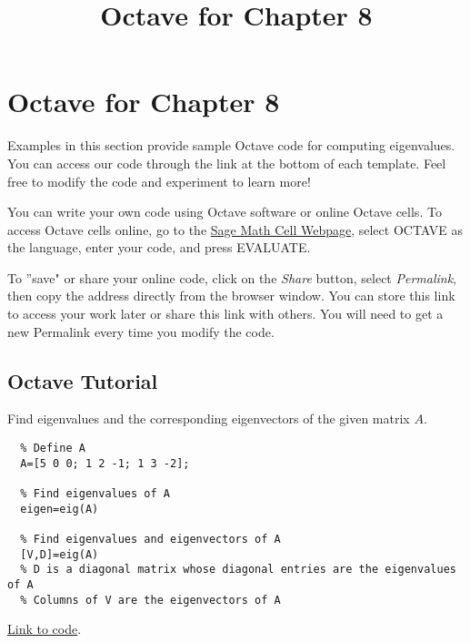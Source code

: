 \documentclass{ximera}
\title{Octave for Chapter 8} \license{CC BY-NC-SA 4.0}
\begin{document}
\begin{abstract}
\end{abstract}
\maketitle

\section*{Octave for Chapter 8}

Examples in this section provide sample Octave code for computing eigenvalues. You can access our code through the link at the bottom of each template.  Feel free to modify the code and experiment to learn more!  

You can write your own code using Octave software or online Octave cells.  To access Octave cells online, go to the \href{https://sagecell.sagemath.org/}{Sage Math Cell Webpage}, select OCTAVE as the language, enter your code, and press EVALUATE.  

To ''save" or share your online code, click on the \emph{Share} button, select \emph{Permalink}, then copy the address directly from the browser window.  You can store this link to access your work later or share this link with others.  You will need to get a new Permalink every time you modify the code.

\subsection*{Octave Tutorial}

\begin{template}\label{temp:eigen}
  Find eigenvalues and the corresponding eigenvectors of the given matrix $A$.
  
  \begin{verbatim}
  % Define A
  A=[5 0 0; 1 2 -1; 1 3 -2];
  
  % Find eigenvalues of A
  eigen=eig(A)
  
  % Find eigenvalues and eigenvectors of A
  [V,D]=eig(A)
  % D is a diagonal matrix whose diagonal entries are the eigenvalues of A
  % Columns of V are the eigenvectors of A 
  \end{verbatim}
  
  \href{https://sagecell.sagemath.org/?z=eJx1jkELgkAUhO8L_oe5LBQkqNFJPCxJP8GLeFjyqQ90F9a1-vmpkEXU5Q0zzPcYiZwaNgQVCJWVJ0SIUsRIEMaLHhEmVRqIQEhc2NQgbsncdD_RCNss2Jpk892p_Z-i3jxdvXUvsiwOebWREjl47qJm3VqjewzaO37g3tmR3imZOV2eOoLv6MciibPtp8Gsvvgqfix4AsFaTeY=&lang=octave&interacts=eJyLjgUAARUAuQ==}{Link to code}.
  \end{template}
  
\end{document}
